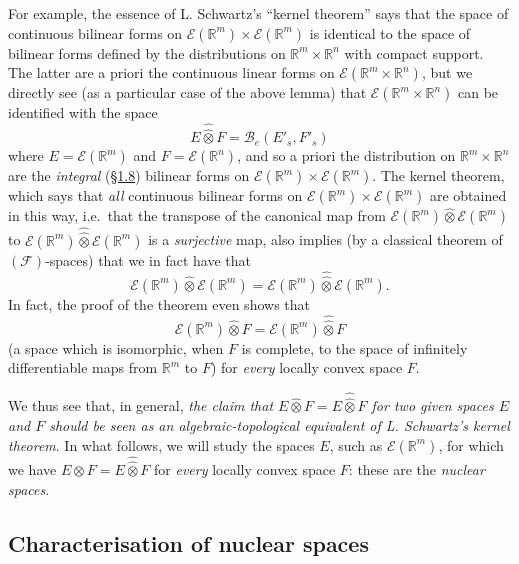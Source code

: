 \documentclass[british]{article}
\newcommand{\oldpage}[1]{\marginpar{\footnotesize$\Big\vert$ \textit{p.~#1}}}
\begin{document}
For example, the essence of L. Schwartz's ``kernel theorem'' says that
the space of continuous bilinear forms on
\(\mathscr{E}(\mathbb{R}^m)\times\mathscr{E}(\mathbb{R}^m)\) is
identical to the space of bilinear forms defined by the distributions on
\(\mathbb{R}^m\times\mathbb{R}^n\) with compact support. The latter are
a priori the continuous linear forms on
\(\mathscr{E}(\mathbb{R}^m\times\mathbb{R}^n)\), but we directly see (as
a particular case of the above lemma) that
\(\mathscr{E}(\mathbb{R}^m\times\mathbb{R}^n)\) can be identified with
the space \[
  E\hat{\hat{\otimes}}F = \mathscr{B}_e(E'_s,F'_s)
\] where \(E=\mathscr{E}(\mathbb{R}^m)\) and
\(F=\mathscr{E}(\mathbb{R}^n)\), and so a priori the distribution on
\(\mathbb{R}^m\times\mathbb{R}^n\) are the \emph{integral}
(\hyperref[section-1.8]{§1.8}) bilinear forms on
\(\mathscr{E}(\mathbb{R}^m)\times\mathscr{E}(\mathbb{R}^m)\). The kernel
theorem, which says that \emph{all} continuous bilinear forms on
\(\mathscr{E}(\mathbb{R}^m)\times\mathscr{E}(\mathbb{R}^m)\) are
obtained in this way, i.e.~that the transpose of the canonical map from
\(\mathscr{E}(\mathbb{R}^m)\hat{\otimes}\mathscr{E}(\mathbb{R}^m)\) to
\(\mathscr{E}(\mathbb{R}^m)\hat{\hat{\otimes}}\mathscr{E}(\mathbb{R}^m)\)
is a \emph{surjective} map, also implies (by a classical theorem of
\((\mathscr{F})\)-spaces) that we in fact have that \[
  \mathscr{E}(\mathbb{R}^m)\hat{\otimes}\mathscr{E}(\mathbb{R}^m)
  = \mathscr{E}(\mathbb{R}^m)\hat{\hat{\otimes}}\mathscr{E}(\mathbb{R}^m).
\] \oldpage{100} In fact, the proof of the theorem even shows that \[
  \mathscr{E}(\mathbb{R}^m)\hat{\otimes}F
  = \mathscr{E}(\mathbb{R}^m)\hat{\hat{\otimes}}F
\] (a space which is isomorphic, when \(F\) is complete, to the space of
infinitely differentiable maps from \(\mathbb{R}^m\) to \(F\)) for
\emph{every} locally convex space \(F\).

We thus see that, in general, \emph{the claim that
\(E\hat{\otimes}F=E\hat{\hat{\otimes}}F\) for two given spaces \(E\) and
\(F\) should be seen as an algebraic-topological equivalent of L.
Schwartz's kernel theorem}. In what follows, we will study the spaces
\(E\), such as \(\mathscr{E}(\mathbb{R}^m)\), for which we have
\(E\hat{\otimes}F=E\hat{\hat{\otimes}}F\) for \emph{every} locally
convex space \(F\): these are the \emph{nuclear spaces}.

\subsection{Characterisation of nuclear spaces}\label{section-2.2}
\end{document}

